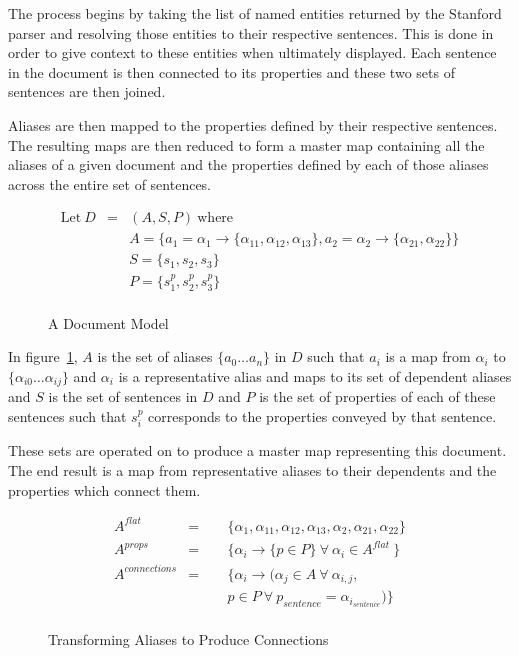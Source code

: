 The process begins by taking the list of named entities returned by the Stanford parser and resolving those entities to their respective sentences.  This is done in order to give context to these entities when ultimately displayed.  Each sentence in the document is then connected to its properties and these two sets of sentences are then joined.

Aliases are then mapped to the properties defined by their respective sentences.  The resulting maps are then reduced to form a master map containing all the aliases of a given document and the properties defined by each of those aliases across the entire set of sentences.

\begin{figure}
\begin{eqnarray*}
\text{Let}\ D &=& (A, S, P)\ \text{where} \\
&& A = \{ a_{1} = \alpha_{1} \to \{ \alpha_{11}, \alpha_{12}, \alpha_{13} \}, a_{2} = \alpha_{2} \to \{ \alpha_{21}, \alpha_{22} \} \}\\
&& S = \{ s_{1}, s_{2}, s_{3} \}\\
&& P = \{ s_{1}^{p}, s_{2}^{p}, s_{3}^{p} \}\\
\end{eqnarray*}
\caption{A Document Model}
\label{fig:doc-model}
\end{figure}

In figure~\ref{fig:doc-model}, $A$ is the set of aliases $\{ a_{0} \dots a_{n} \}$ in $D$ such that $a_{i}$ is a map  from $\alpha_{i}$ to  $\{ \alpha_{i0} \dots \alpha_{ij} \}$ and $\alpha_{i}$ is a representative alias and maps to its set of dependent aliases and $S$ is the set of sentences in $D$ and $P$ is the set of properties of each of these sentences such that $s_{i}^{p}$ corresponds to the properties conveyed by that sentence.

These sets are operated on to produce a master map representing this document.  The end result is a map from representative aliases to their dependents and the properties which connect them.

\begin{figure}
\begin{eqnarray*}
A^{flat} &=& \{ \alpha_{1}, \alpha_{11}, \alpha_{12}, \alpha_{13}, \alpha_{2}, \alpha_{21}, \alpha_{22} \}\\
A^{props} &=& \{ \alpha_{i} \to \{ p \in P \}\ \forall\ \alpha_i \in A^{flat}\ \} \\
A^{connections} &=& \{ \alpha_i \to (\alpha_j \in A\ \forall\ \alpha_{i,j},  \\
&\qquad&                                    p \in P\ \forall\ p_{sentence} = \alpha_i_{sentence}) \} \\
\end{eqnarray*}
\caption{Transforming Aliases to Produce Connections}
\label{fig:alias-transform}
\end{figure}

